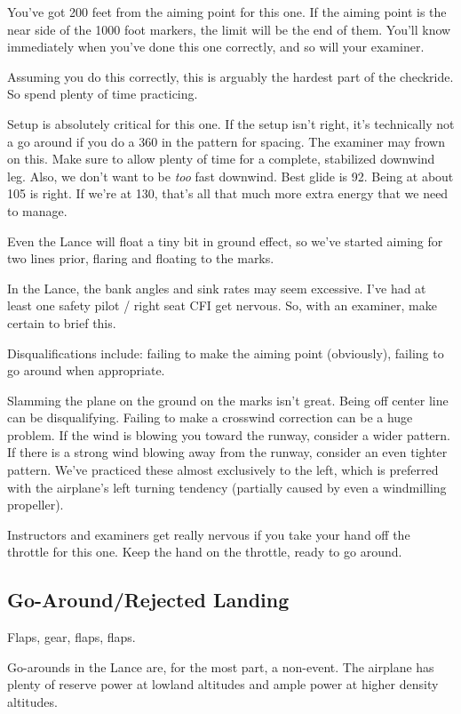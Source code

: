 You've got 200 feet from the aiming point for this one. If the aiming point is the near side of the 1000 foot markers, the limit will be the end of them. You'll know immediately when you've done this one correctly, and so will your examiner.

Assuming you do this correctly, this is arguably the hardest part of the checkride. So spend plenty of time practicing.

Setup is absolutely critical for this one. If the setup isn't right, it's technically not a go around if you do a 360 in the pattern for spacing. The examiner may frown on this. Make sure to allow plenty of time for a complete, stabilized downwind leg. Also, we don't want to be \emph{too} fast downwind. Best glide is 92. Being at about 105 is right. If we're at 130, that's all that much more extra energy that we need to manage.

Even the Lance will float a tiny bit in ground effect, so we've started aiming for two lines prior, flaring and floating to the marks.

In the Lance, the bank angles and sink rates may seem excessive. I've had at least one safety pilot / right seat CFI get nervous. So, with an examiner, make certain to brief this.

Disqualifications include: failing to make the aiming point (obviously), failing to go around when appropriate.

Slamming the plane on the ground on the marks isn't great. Being off center line can be disqualifying. Failing to make a crosswind correction can be a huge problem. If the wind is blowing you toward the runway, consider a wider pattern. If there is a strong wind blowing away from the runway, consider an even tighter pattern. We've practiced these almost exclusively to the left, which is preferred with the airplane's left turning tendency (partially caused by even a windmilling propeller).

Instructors and examiners get really nervous if you take your hand off the throttle for this one. Keep the hand on the throttle, ready to go around.

\subsection{Go-Around/Rejected Landing}

Flaps, gear, flaps, flaps.

Go-arounds in the Lance are, for the most part, a non-event. The airplane has plenty of reserve power at lowland altitudes and ample power at higher density altitudes.

